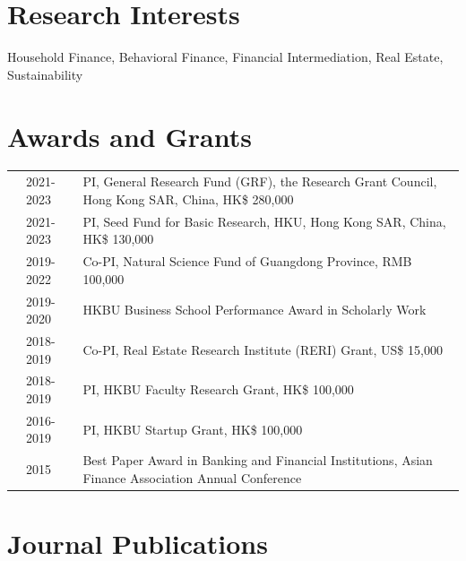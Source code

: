 \documentclass[margin,line]{res}
\newenvironment{list1}{
  \begin{list}{\ding{113}}{%
      \setlength{\itemsep}{0in}
      \setlength{\parsep}{0in} \setlength{\parskip}{0in}
      \setlength{\topsep}{0in} \setlength{\partopsep}{0in} 
      \setlength{\leftmargin}{0.17in}}}{\end{list}}
\begin{document}
\begin{resume}
\section{\sc Research Interests}
\begin{list1}
\item[]  Household Finance, Behavioral Finance, Financial Intermediation, Real Estate, Sustainability  %
\end{list1}

\section{\sc Awards and Grants}
\vspace{.1cm}
\begin{tabular}{@{}p{0.0 in}p{0.6 in}p{4.60in}}
	& 2021-2023 & PI, General Research Fund (GRF), the Research Grant Council, Hong Kong SAR, China, HK\$ 280,000 \\
	& 2021-2023 & PI, Seed Fund for Basic Research, HKU, Hong Kong SAR, China, HK\$ 130,000 \\	
	& 2019-2022   & Co-PI, Natural Science Fund of Guangdong Province, RMB 100,000 \\
	& 2019-2020   & HKBU Business School Performance Award in Scholarly Work \\	
	& 2018-2019   & Co-PI, Real Estate Research Institute (RERI) Grant, US\$ 15,000 \\
	& 2018-2019   & PI, HKBU Faculty Research Grant, HK\$ 100,000 \\
	& 2016-2019   & PI, HKBU Startup Grant, HK\$ 100,000 \\			
	& 2015   & Best Paper Award in Banking and Financial Institutions, Asian Finance Association
	Annual Conference \\		
\end{tabular}
\section{\sc Journal Publications}
\begin{enumerate}


\end{enumerate}
\end{resume}
\end{document}
